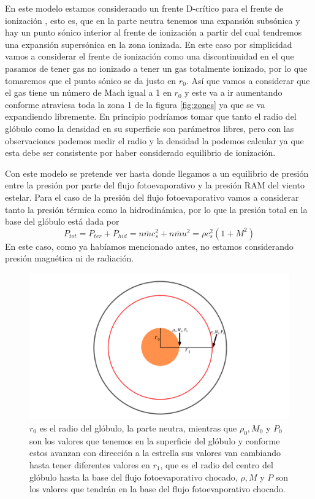 \documentclass{book}
\begin{document}
En este modelo  estamos considerando un frente D-crítico para el frente de ionización \citep{Shuu:1992}, esto es, que en la parte neutra tenemos una expansión subsónica y hay un punto sónico interior al frente de ionización a partir del cual tendremos una expansión supersónica en la zona ionizada. En este caso por simplicidad vamos a considerar el frente de ionización como una discontinuidad en el que pasamos de tener gas no ionizado a tener un gas totalmente ionizado, por lo que tomaremos que el punto sónico se da justo en $r_0$. Así que vamos a considerar que el gas tiene un número de Mach igual a 1 en $r_0$ y este va a ir aumentando conforme atraviesa toda la zona 1 de la figura \ref{fig:zones} ya que se va expandiendo libremente. En principio podríamos tomar que tanto el radio del glóbulo como la densidad en su superficie son parámetros libres, pero con las observaciones podemos medir el radio y la densidad la podemos calcular ya que esta debe ser consistente por haber considerado equilibrio de ionización.

Con este modelo se pretende ver hasta donde llegamos a un equilibrio de presión entre la presión por parte del flujo fotoevaporativo y la presión RAM del viento estelar. Para el caso de la presión del flujo fotoevaporativo vamos a considerar tanto la presión térmica como la hidrodinámica, por lo que la presión total en la base del glóbulo está dada por
\[P_{tot}=P_{ter}+P_{hid}=n\bar{m}c_s^2+n\bar{m}u^2=\rho c_s^2(1+M^2)\]
En este caso, como ya habíamos mencionado antes, no estamos considerando presión magnética ni de radiación.

\begin{figure}[htb]
    \centering \includegraphics[width=\textwidth]{artesanales/ImgFi01-3.pdf}
    \caption{$r_0$ es el radio del glóbulo, la parte neutra, mientras que $\rho_0,M_0$ y $P_0$ son los valores que tenemos en la superficie del glóbulo y conforme estos avanzan con dirección a la estrella sus valores van cambiando hasta tener diferentes valores en $r_1$, que es el radio del centro del glóbulo hasta la base del flujo fotoevaporativo chocado, $\rho,M$ y $P$ son los valores que tendrán en la base del flujo fotoevaporativo chocado.}
    \label{fig:parameters}
\end{figure}
\end{document}
